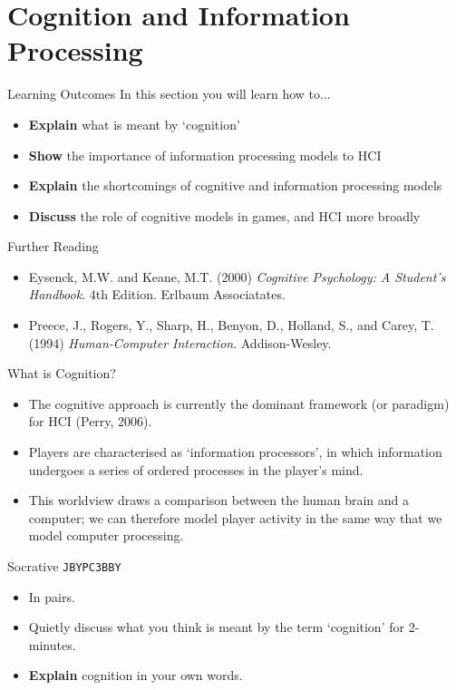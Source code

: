 \part{Cognition and Information Processing}
\frame{\partpage}

\begin{frame}{Learning Outcomes}
	In this section you will learn how to...
	
	\begin{itemize}
		\item \textbf{Explain} what is meant by `cognition'
		\item \textbf{Show} the importance of information processing models to HCI
		\item \textbf{Explain} the shortcomings of cognitive and information processing models
		\item \textbf{Discuss} the role of cognitive models in games, and HCI more broadly
	\end{itemize}
\end{frame}

\begin{frame}{Further Reading}
	\begin{itemize}
		\item Eysenck, M.W. and Keane, M.T. (2000) \textit{Cognitive Psychology: A Student's Handbook}. 4th Edition. Erlbaum Associatates.
		\item Preece, J., Rogers, Y., Sharp, H., Benyon, D., Holland, S., and Carey, T. (1994) \textit{Human-Computer Interaction}. Addison-Wesley.
	\end{itemize}
\end{frame}

\begin{frame}{What is Cognition?}
	\begin{itemize}
		\item The cognitive approach is currently the dominant framework (or paradigm) for HCI (Perry, 2006).
		\item Players are characterised as `information processors', in which information undergoes a series of ordered processes
		in the player's mind.
		\item This worldview draws a comparison between the human brain and a computer; we can therefore model player activity in the same
		way that we model computer processing.
	\end{itemize}
\end{frame}

\begin{frame}[fragile]{Socrative \texttt{JBYPC3BBY}}
	\begin{itemize}
		\item In pairs.
		\item Quietly discuss what you think is meant by the term `cognition' for 2-minutes.
		\item \textbf{Explain} cognition in your own words.
	\end{itemize}
\end{frame}


